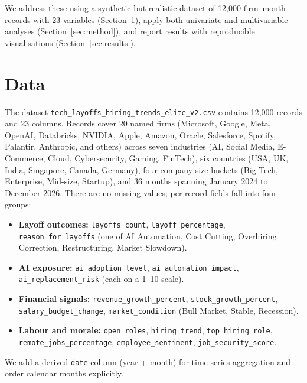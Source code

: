 \documentclass[11pt]{article}
\begin{document}
We address these using a synthetic-but-realistic dataset of 12{,}000 firm--month records with 23 variables (Section~\ref{sec:data}), apply both univariate and multivariable analyses (Section~\ref{sec:method}), and report results with reproducible visualisations (Section~\ref{sec:results}).

\section{Data}
\label{sec:data}
The dataset \texttt{tech\_layoffs\_hiring\_trends\_elite\_v2.csv} contains 12{,}000 records and 23 columns. Records cover 20 named firms (Microsoft, Google, Meta, OpenAI, Databricks, NVIDIA, Apple, Amazon, Oracle, Salesforce, Spotify, Palantir, Anthropic, and others) across seven industries (AI, Social Media, E-Commerce, Cloud, Cybersecurity, Gaming, FinTech), six countries (USA, UK, India, Singapore, Canada, Germany), four company-size buckets (Big Tech, Enterprise, Mid-size, Startup), and 36 months spanning January 2024 to December 2026. There are no missing values; per-record fields fall into four groups:

\begin{itemize}
\item \textbf{Layoff outcomes:} \texttt{layoffs\_count}, \texttt{layoff\_percentage}, \texttt{reason\_for\_layoffs} (one of AI Automation, Cost Cutting, Overhiring Correction, Restructuring, Market Slowdown).
\item \textbf{AI exposure:} \texttt{ai\_adoption\_level}, \texttt{ai\_automation\_impact}, \texttt{ai\_replacement\_risk} (each on a 1--10 scale).
\item \textbf{Financial signals:} \texttt{revenue\_growth\_percent}, \texttt{stock\_growth\_percent}, \texttt{salary\_budget\_change}, \texttt{market\_condition} (Bull Market, Stable, Recession).
\item \textbf{Labour and morale:} \texttt{open\_roles}, \texttt{hiring\_trend}, \texttt{top\_hiring\_role}, \texttt{remote\_jobs\_percentage}, \texttt{employee\_sentiment}, \texttt{job\_security\_score}.
\end{itemize}

We add a derived \texttt{date} column (year + month) for time-series aggregation and order calendar months explicitly.
\end{document}
